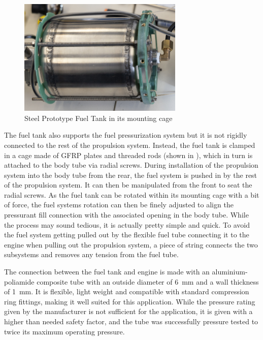 \begin{figure}[H]
\centering
\includegraphics[width=0.7\textwidth]{Propulsion/fuelTankMounting.jpg}
\caption{Steel Prototype Fuel Tank in its mounting cage}
\label{fig:sysarch_prop_fuelTankMounting}
\end{figure}

The fuel tank also supports the fuel pressurization system but it is not rigidly connected to the rest of the propulsion system. Instead, the fuel tank is clamped in a cage made of GFRP plates and threaded rods (shown in ), which in turn is attached to the body tube via radial screws. During installation of the propulsion system into the body tube from the rear, the fuel system is pushed in by the rest of the propulsion system. It can then be manipulated from the front to seat the radial screws. As the fuel tank can be rotated within its mounting cage with a bit of force, the fuel systems rotation can then be finely adjusted to align the pressurant fill connection with the associated opening in the body tube. While the process may sound tedious, it is actually pretty simple and quick. To avoid the fuel system getting pulled out by the flexible fuel tube connecting it to the engine when pulling out the propulsion system, a piece of string connects the two subsystems and removes any tension from the fuel tube.

The connection between the fuel tank and engine is made with an aluminium-poliamide composite tube with an outside diameter of \SI{6}{\milli\meter} and a wall thickness of \SI{1}{\milli\meter}. It is flexible, light weight and compatible with standard compression ring fittings, making it well suited for this application. While the pressure rating given by the manufacturer is not sufficient for the application, it is given with a higher than needed safety factor, and the tube was successfully pressure tested to twice its maximum operating pressure.

